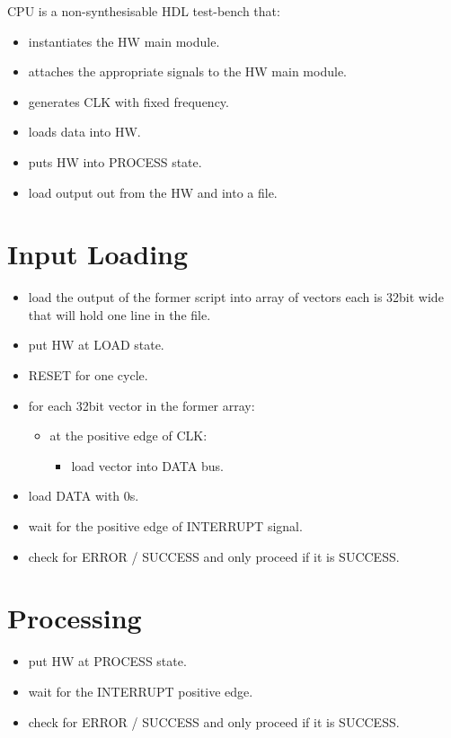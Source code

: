 \documentclass[12pt]{report}
\begin{document}
CPU is a non-synthesisable HDL test-bench that:
\begin{itemize}
    \item instantiates the HW main module.
    \item attaches the appropriate signals to the HW main module.
    \item generates CLK with fixed frequency.
    \item loads data into HW.
    \item puts HW into PROCESS state.
    \item load output out from the HW and into a file.
\end{itemize}

\section{Input Loading}
\begin{itemize}
    \item load the output of the former script into array of vectors each is 32bit wide that will hold one line in the file.
    \item put HW at LOAD state.
    \item RESET for one cycle.
    \item for each 32bit vector in the former array:
    \begin{itemize}
        \item at the positive edge of CLK:
        \begin{itemize}
            \item load vector into DATA bus.
        \end{itemize}
    \end{itemize}
    \item load DATA with 0s.
    \item wait for the positive edge of INTERRUPT signal.
    \item check for ERROR / SUCCESS and only proceed if it is SUCCESS.
\end{itemize}

\section{Processing}
\begin{itemize}
    \item put HW at PROCESS state.
    \item wait for the {INTERRUPT} positive edge.
    \item check for {ERROR / SUCCESS} and only proceed if it is SUCCESS.
\end{itemize}
\end{document}
